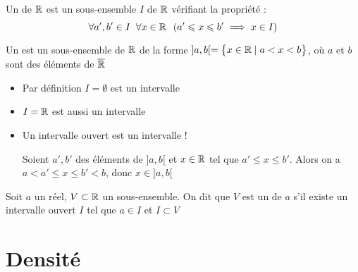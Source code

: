 \begin{frame}

	
\begin{mydefinition}
Un  de $\mathbb{R}$ est un sous-ensemble $I$ de $\mathbb{R}$ vérifiant la propriété :
\[ \forall a',b' \in I \;\;  \forall x\in \mathbb{R}\;\; \left( a'\leqslant x \leqslant b' \implies x \in I \right )\]
\end{mydefinition} 

\pause




\begin{mydefinition}
Un  est un sous-ensemble de $\mathbb{R}$ de la forme 
\( ]a,b[=\big\{x \in \mathbb{R}\;  |\; a<x<b\big\}\), où $a$ et $b$ sont des éléments de $\overline{\mathbb{R}}$
\end{mydefinition} 

\pause

\begin{remarque}
\begin{itemize}
\item Par définition $I=\emptyset$ est un intervalle

\item $I=\mathbb{R}$ est aussi un intervalle

\item Un intervalle ouvert est un intervalle !

Soient $a',b'$ des éléments de $]a,b[$ et $x\in \mathbb{R}$ tel que $a'\leq x \leq b'$. 
Alors on a $a<a'\leq x \leq b'<b$, donc $x\in ]a,b[$
\end{itemize}
\end{remarque}
\end{frame}


\begin{frame}
\begin{mydefinition}
Soit $a$ un réel, $V\subset \mathbb{R}$ un sous-ensemble. 
On dit que $V$ est un  de $a$ s'il existe un intervalle 
ouvert $I$ tel que $a\in I$ et $I\subset V$
\end{mydefinition}

\bigskip

	
\end{frame}



\section*{Densité}


